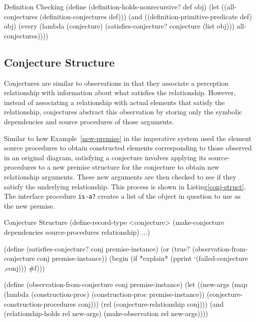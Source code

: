 \begin{code-listing}
[label=def-holds]
{Definition Checking}
(define (definition-holds-nonrecursive? def obj)
  (let ((all-conjectures (definition-conjectures def)))
    (and ((definition-primitive-predicate def) obj)
         (every (lambda (conjecture)
                  (satisfies-conjecture? conjecture (list obj)))
                all-conjectures))))
\end{code-listing}

\subsection{Conjecture Structure}

Conjectures are similar to observations in that they associate a
perception relationship with information about what satisfies the
relationship. However, instead of associating a relationship with
actual elements that satisfy the relationship, conjectures abstract
this observation by storing only the symbolic dependencies and source
procedures of those arguments.

Similar to how Example~\ref{new-premise} in the imperative system used
the element source procedures to obtain constructed elements
corresponding to those observed in an original diagram, satisfying a
conjecture involves applying its source-procedures to a new premise
structure for the conjecture to obtain new relationship
arguments. These new arguments are then checked to see if they satisfy
the underlying relationship. This process is shown in
Listing\ref{conj-struct}. The interface procedure \texttt{is-a?}
creates a list of the object in question to use as the new premise.

\begin{code-listing}
[label=conj-struct]
{Conjecture Structure}
(define-record-type <conjecture>
  (make-conjecture dependencies source-procedures relationship) ...)

(define (satisfies-conjecture? conj premise-instance)
  (or (true? (observation-from-conjecture conj premise-instance))
      (begin (if *explain* (pprint `(failed-conjecture ,conj)))
             #f)))

(define (observation-from-conjecture conj premise-instance)
  (let ((new-args
         (map (lambda (construction-proc)
                (construction-proc premise-instance))
          (conjecture-construction-procedures conj)))
        (rel (conjecture-relationship conj)))
    (and (relationship-holds rel new-args)
         (make-observation rel new-args))))
\end{code-listing}

